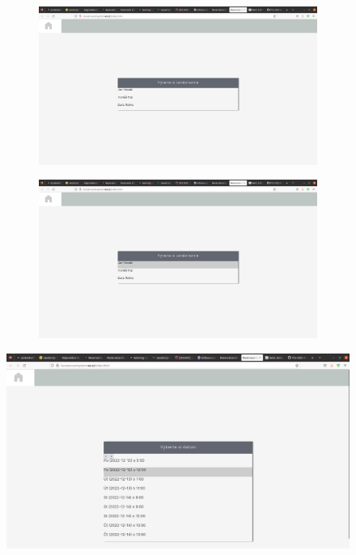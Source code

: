 \begin{figure}[h]
    \begin{subfigure}{.5\textwidth}
        \centering
        \includegraphics[width=.8\linewidth]{doc/latex/fig/implementation/client/step5.png}
        \caption{}
        \label{fig:step5}
    \end{subfigure}
    \begin{subfigure}{.5\textwidth}
        \centering
        \includegraphics[width=.8\linewidth]{doc/latex/fig/implementation/client/step6.png}
        \caption{}
        \label{fig:step6}
    \end{subfigure}
    \caption{}
    \label{fig:steps3}
\end{figure}

\begin{figure}[h]
    \centering
    \includegraphics[width=.8\textwidth]{doc/latex/fig/implementation/client/step7.png}
    \caption{}
    \label{fig:step7}
\end{figure}

\newpage

